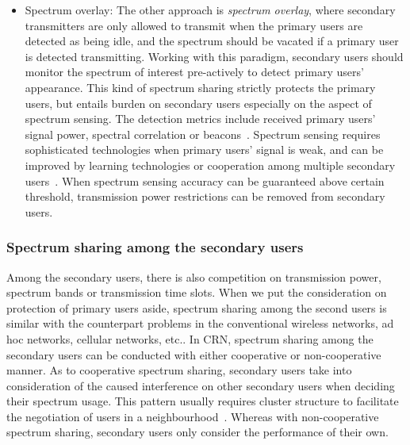 \begin{itemize}
\item \label{overlay} Spectrum overlay:
The other approach is \textit{spectrum overlay}, where secondary transmitters are only allowed to transmit when the primary users are detected as being idle, and the spectrum should be vacated if a primary user is detected transmitting.
Working with this paradigm, secondary users should monitor the spectrum of interest pre-actively to detect primary users' appearance.
This kind of spectrum sharing strictly protects the primary users, but entails burden on secondary users especially on the aspect of spectrum sensing.
The detection metrics include received primary users' signal power, spectral correlation or beacons~\cite{crnsensing_09}.
Spectrum sensing requires sophisticated technologies when primary users' signal is weak, and can be improved by learning technologies or cooperation among multiple secondary users~\cite{coorperativeSensing_Akyildiz11}.
When spectrum sensing accuracy can be guaranteed above certain threshold, transmission power restrictions can be removed from  secondary users.


\end{itemize}



\subsubsection{Spectrum sharing among the secondary users}
Among the secondary users, there is also competition on transmission power, spectrum bands or transmission time slots.
When we put the consideration on protection of primary users aside, spectrum sharing among the second users is similar with the counterpart problems in the conventional wireless networks, \ie ad hoc networks, cellular networks, etc..
In CRN, spectrum sharing among the secondary users can be conducted with either cooperative or non-cooperative manner.
As to cooperative spectrum sharing, secondary users take into consideration of the caused interference on other secondary users when deciding their spectrum usage.
This pattern usually requires cluster structure to facilitate the negotiation of users in a neighbourhood~\cite{Chen07}.
Whereas with non-cooperative spectrum sharing, secondary users only consider the performance of their own.








